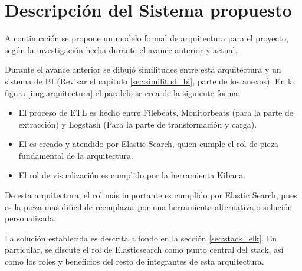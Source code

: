 \section{Descripción del Sistema propuesto}
\label{section:descripcion}

A continuación se propone un modelo formal de arquitectura para el proyecto, según la investigación hecha durante el avance anterior y actual.


Durante el avance anterior se dibujó similitudes entre esta arquitectura y un sistema de BI (Revisar el capítulo \ref{sec:similitud_bi}, parte de los anexos). En la figura \ref{img:arquitectura} el paralelo se crea de la siguiente forma:

\begin{itemize}
  \item El proceso de ETL es hecho entre Filebeats, Monitorbeats (para la parte de extracción) y Logstash (Para la parte de transformación y carga).
  \item El  es creado y atendido por Elastic Search, quien cumple el rol de pieza fundamental de la arquitectura.
  \item El rol de visualización es cumplido por la herramienta Kibana.
\end{itemize}

De esta arquitectura, el rol más importante es cumplido por Elastic Search, pues es la pieza maś difícil de reemplazar por una herramienta alternativa o solución personalizada. 

La solución establecida es descrita a fondo en la sección \ref{sec:stack_elk}. En particular, se discute el rol de Elasticsearch como punto central del stack, así como los roles y beneficios del resto de integrantes de esta arquitectura.

\clearpage
